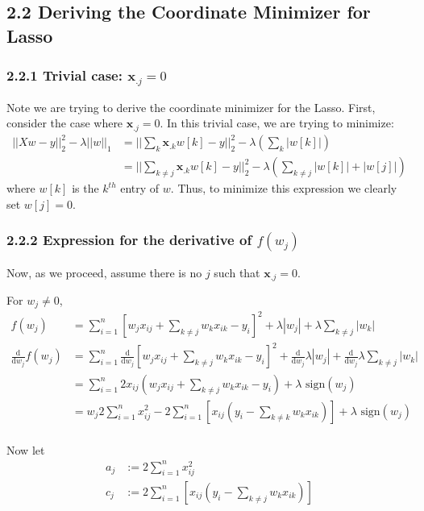 \documentclass[paper=a4, fontsize=11pt]{scrartcl} %
\numberwithin{equation}{section} %
\numberwithin{figure}{section} %
\numberwithin{table}{section} %
\begin{document}
\subsection*{2.2 Deriving the Coordinate Minimizer for Lasso}

\subsubsection*{2.2.1 Trivial case: $\bm{x}_{.j} = 0$}

Note we are trying to derive the coordinate minimizer for the Lasso. First, consider the case where $\bm{x}_{.j} = 0$. In this trivial case, we are trying to minimize:
\begin{align*}
||Xw - y||_2^2 - \lambda ||w||_1 &= ||\sum_{k} \bm{x}_{.k}w[k] - y||_2^2 - \lambda (\sum_k |w[k]|) \\
	&= ||\sum_{k \ne j} \bm{x}_{.k}w[k] - y||_2^2 - \lambda (\sum_{k \ne j} |w[k]| + |w[j]|)
\end{align*}
where $w[k]$ is the $k^{th}$ entry of $w$. Thus, to minimize this expression we clearly set $w[j] = 0$.

\subsubsection*{2.2.2 Expression for the derivative of $f(w_j)$}
Now, as we proceed, assume there is no $j$ such that $\bm{x}_{.j} = 0$.

For $w_j \ne 0$,
\begin{align*}
f(w_j) &= \sum_{i = 1}^n \left[w_j x_{ij} + \sum_{k \ne j} w_k x_{ik} - y_i\right]^2 + \lambda |w_j| + \lambda \sum_{k\ne j}|w_k| \\
\frac{\textrm{d}}{\textrm{d} w_j}f(w_j) &= \sum_{i = 1}^n \frac{\textrm{d}}{\textrm{d} w_j}\left[w_j x_{ij} + \sum_{k \ne j} w_k x_{ik} - y_i\right]^2 + \frac{\textrm{d}}{\textrm{d} w_j}\lambda |w_j| +\frac{\textrm{d}}{\textrm{d} w_j} \lambda \sum_{k\ne j}|w_k| \\
	&= \sum_{i = 1}^n 2 x_{ij} \left(w_j x_{ij} + \sum_{k \ne j} w_k x_{ik} - y_i\right) + \lambda \textrm{ sign}(w_j)\\
	&= w_j 2 \sum_{i = 1}^n x_{ij}^2 - 2 \sum_{i = 1}^n\left[ x_{ij}(y_i - \sum_{k \ne k} w_k x_{ik})\right] + \lambda \textrm{ sign}(w_j)\\
\end{align*}

Now let
\begin{align*}
a_j &:= 2 \sum_{i=1}^n x_{ij}^2\\
c_j &:= 2 \sum_{i = 1}^n\left[ x_{ij}(y_i - \sum_{k \ne j} w_k x_{ik})\right] 
\end{align*}
\end{document}
